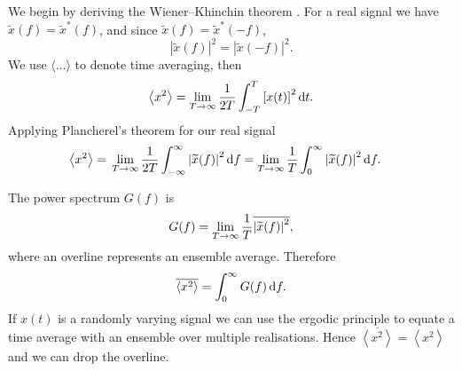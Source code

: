 We begin by deriving the Wiener--Khinchin theorem \citep[chapter 28]{Kittel1958}. For a real signal we have $\widetilde{x}(f) = \widetilde{x}^\ast(f)$, and since $\widetilde{x}(f) = \widetilde{x}^\ast(-f)$,
\begin{equation}
\left|\widetilde{x}(f)\right|^2 = \left|\widetilde{x}(-f)\right|^2.
\end{equation}
We use $\langle\ldots\rangle$ to denote time averaging, then
\begin{equation}
\left\langle x^2\right\rangle = \lim_{T \rightarrow \infty} \frac{1}{2T} \int_{-T}^{T}{\left[x(t)\right]^2}\,\mathrm{d}{t}.
\end{equation}
Applying Plancherel's theorem for our real signal
\begin{align}
\left\langle x^2\right\rangle = {} & \lim_{T \rightarrow \infty} \frac{1}{2T} \int_{-\infty}^{\infty}{\left|\widetilde{x}(f)\right|^2}\,\mathrm{d}{f} = \lim_{T \rightarrow \infty} \frac{1}{T} \int_{0}^{\infty}{\left|\widetilde{x}(f)\right|^2}\,\mathrm{d}{f}.
\end{align}

The power spectrum $G(f)$ is
\begin{equation}
G(f) = \lim_{T \rightarrow \infty} \frac{1}{T} \overline{\left|\widetilde{x}(f)\right|^2},
\end{equation}
where an overline represents an ensemble average. Therefore
\begin{equation}
\overline{\left\langle x^2\right\rangle} = \int_{0}^{\infty}{G(f)}\,\mathrm{d}{f}.
\end{equation}
If $x(t)$ is a randomly varying signal we can use the ergodic principle to equate a time average with an ensemble over multiple realisations. Hence $\overline{\left\langle x^2\right\rangle} = \left\langle x^2\right\rangle$ and we can drop the overline.

